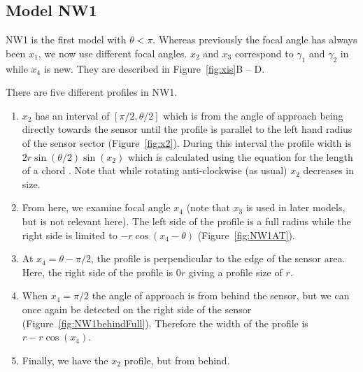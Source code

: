 \subsection{Model NW1} \label{NW1}

NW1 is the first model with $\theta < \pi$.
Whereas previously the focal angle has always been $x_1$, we now use different focal angles.
$x_2$ and $x_3$ correspond to $\gamma_1$ and $\gamma_2$ in \cite{rowcliffe2008estimating} while $x_4$ is new.
They are described in Figure~\ref{fig:xis}B -- D.

There are five different profiles in NW1.
\begin{enumerate}
\item $x_2$ has an interval of $[\pi/2, \theta/2]$ which is from the angle of approach being directly towards the sensor until the profile is parallel to the left hand radius of the sensor sector (Figure~\ref{fig:x2}).
During this interval the profile width is $2r\sin\left(\theta/2\right)\sin(x_2)$ which is calculated using the equation for the length of a chord .
Note that while rotating anti-clockwise (as usual) $x_2$ decreases in size.
\item From here, we examine focal angle $x_4$ (note that $x_3$ is used in later models, but is not relevant here).  The left side of the profile is a full radius while the right side is limited to $- r\cos(x_4 - \theta)$ (Figure~\ref{fig:NW1AT}).
\item At $x_4 =  \theta - \pi/2$, the profile is perpendicular to the edge of the sensor area.
Here, the right side of the profile is $0r$ giving a profile size of $r$.
\item When $x_4 = \pi/2$ the angle of approach is from behind the sensor, but we can once again be detected on the right side of the sensor (Figure~\ref{fig:NW1behindFull}).
Therefore the width of the profile is $r - r\cos(x_4)$.
\item  Finally, we have the $x_2$ profile, but from behind.
\end{enumerate}





